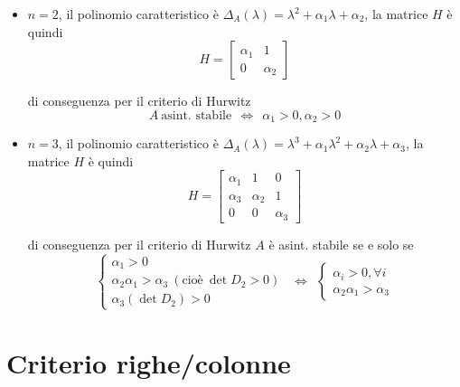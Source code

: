 \documentclass[10pt,a4paper]{book}
\begin{document}
\begin{itemize}
	\item $n=2$, il polinomio caratteristico è $\Delta _A\left(\lambda \right) =\lambda ^2 +\alpha _1 \lambda +\alpha _2$, la matrice $H$ è quindi\begin{equation*}
	      H=\begin{bmatrix}
	      \alpha _1 & 1\\
	      0 & \alpha _2
	\end{bmatrix}
	\end{equation*}
	
	di conseguenza per il criterio di Hurwitz\begin{equation*}
	A\ \text{asint. stabile} \ \ \Leftrightarrow \ \ \alpha _1  >0,\alpha _2  >0
	\end{equation*}
	\item $n=3$, il polinomio caratteristico è $\Delta _A\left(\lambda \right) =\lambda ^3 +\alpha _1 \lambda ^2 +\alpha _2 \lambda +\alpha _3$, la matrice $H$ è quindi\begin{equation*}
	      H=\begin{bmatrix}
	      \alpha _1 & 1 & 0\\
	      \alpha _3 & \alpha _2 & 1\\
	      0 & 0 & \alpha _3
	\end{bmatrix}
	\end{equation*}
	
	di conseguenza per il criterio di Hurwitz $A$ è asint. stabile se e solo se\begin{equation*}
	\begin{cases}
		\alpha _1  >0                                                              \\
		\alpha _2 \alpha _1  >\alpha _3 \ \left(\text{cioè} \ \det D_2  >0\right) \\
		\alpha _3\left(\det D_2\right)  >0                                         
	\end{cases} \ \ \Leftrightarrow \ \ \begin{cases}
	\alpha _i  >0,\forall i\\
	\alpha _2 \alpha _1  >\alpha _3
	\end{cases}
	\end{equation*}
\end{itemize}


\section{Criterio righe/colonne}
\end{document}
